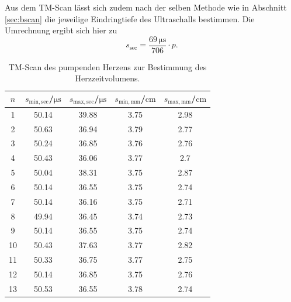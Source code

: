 Aus dem TM-Scan lässt sich zudem nach der selben Methode wie in Abschnitt \ref{sec:bscan} die jeweilige Eindringtiefe des Ultraschalls bestimmen.
Die Umrechnung ergibt sich hier zu
\begin{equation}
  s_\mathrm{sec}=\frac{69\, \si{\micro\second}}{706}\cdot p \text{.}
\end{equation}
\begin{table}
  \centering
  \caption{TM-Scan des pumpenden Herzens zur Bestimmung des Herzzeitvolumens.}
  \label{tab:herz}
\begin{tabular}{ccccc}
  \toprule
$n$& $s_\mathrm{min,sec}$/$\si{\micro\second}$ &$s_\mathrm{max,sec}$/$\si{\micro\second}$  & $s_\mathrm{min,mm}$/$\si{\centi\meter}$  & $s_\mathrm{max,mm}$/$\si{\centi\meter}$ \\
\midrule
1  & 50.14 & 39.88 & 3.75 & 2.98 \\
2  & 50.63 & 36.94 & 3.79 & 2.77 \\
3  & 50.24 & 36.85 & 3.76 & 2.76 \\
4  & 50.43 & 36.06 & 3.77 & 2.7 \\
5  & 50.04 & 38.31 & 3.75 & 2.87 \\
6  & 50.14 & 36.55 & 3.75 & 2.74 \\
7  & 50.14 & 36.16 & 3.75 & 2.71 \\
8  & 49.94 & 36.45 & 3.74 & 2.73 \\
9  & 50.14 & 36.55 & 3.75 & 2.74 \\
10  & 50.43 & 37.63 & 3.77 & 2.82 \\
11  & 50.33 & 36.75 & 3.77 & 2.75 \\
12  & 50.14 & 36.85 & 3.75 & 2.76 \\
13  & 50.53 & 36.55 & 3.78 & 2.74 \\
\bottomrule
\end{tabular}
\end{table}

